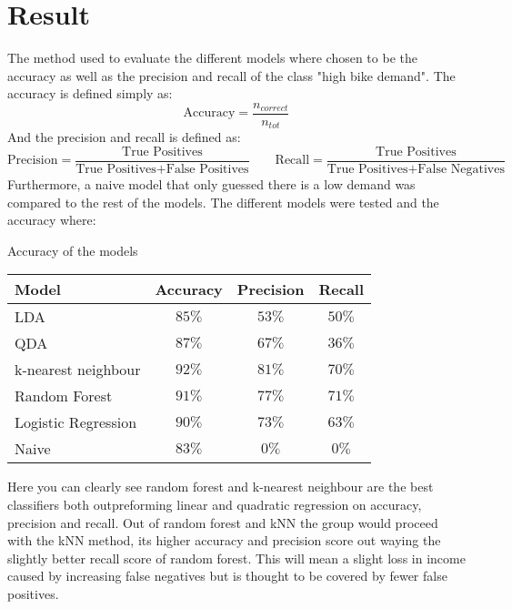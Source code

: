 \section{Result}

The method used to evaluate the different models where chosen to be the accuracy as well as the precision and recall of the class "high bike demand".
The accuracy is defined simply as:
\begin{equation*}
    \text{Accuracy} = \frac{n_{correct}}{n_{tot}}
\end{equation*}
And the precision and recall is defined as:
\begin{equation*}
    \text{Precision} = \frac{\text{True Positives}}{\text{True Positives} + \text{False Positives}}
    \qquad
    \text{Recall} = \frac{\text{True Positives}}{\text{True Positives} + \text{False Negatives}}
\end{equation*}
Furthermore, a naive model that only guessed there is a low demand was compared to the rest of the models.
The different models were tested and the accuracy where:
\\
\begin{table*}[h]
    \begin{center}
        Accuracy of the models
        \\
        \begin{tabular}{|l|c|c|c|}
            \hline
            Model & Accuracy & Precision & Recall \\
            \hline
            LDA & $85\%$ & $53\%$ & $50\%$ \\
            QDA & $87\%$ & $67\%$ & $36\%$ \\
            k-nearest neighbour & $92\%$ & $81\%$ & $70\%$ \\
            Random Forest & $91\%$ & $77\%$ &$71\%$ \\
            Logistic Regression & $90\%$ & $73\%$ &$63\%$ \\ 
            Naive & $83\%$ & $0\%$ & $0\%$ \\
            \hline
        \end{tabular}
    \end{center}
\end{table*}
Here you can clearly see random forest and k-nearest neighbour are the best classifiers both outpreforming linear and quadratic regression on accuracy, precision and recall.
Out of random forest and kNN the group would proceed with the kNN method, its higher accuracy and precision score out waying the slightly better recall score of random forest. 
This will mean a slight loss in income caused by increasing false negatives but is thought to be covered by fewer false positives.

